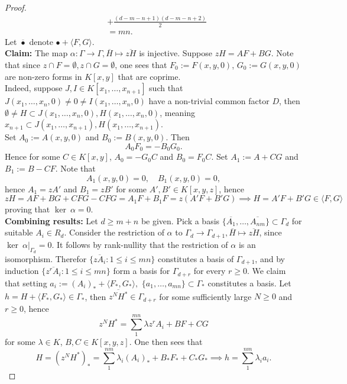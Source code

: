 \begin{proof}
\begin{align*}
            &+\frac{(d-m-n+1)(d-m-n+2)}{2}\\
            &= mn.
        \end{align*}
        Let $\overline{\bullet}$ denote $\bullet + \langle F,G\rangle$.\\
        \textbf{Claim:} The map $\alpha : \Gamma\rightarrow \Gamma, \overline{H} \mapsto \overline{zH}$ is injective. Suppose $zH=AF+BG$. Note that since $z\cap F = \emptyset,z\cap G = \emptyset$, one sees that $F_0:=F(x,y,0)$, $G_0:=G(x,y,0)$ are non-zero forms in $K[x,y]$ that are coprime.\\
        Indeed, suppose $J,I\in K[x_1,\dots,x_{n+1}]$ such that $J(x_1,\dots,x_n,0)\neq 0 \neq I(x_1,\dots,x_n,0)$ have a non-trivial common factor $D$, then $\emptyset\neq H\subset J(x_1,\dots,x_n,0),H(x_1,\dots,x_n,0)$, meaning $x_{n+1}\subset J(x_1,\dots,x_{n+1}),H(x_1,\dots,x_{n+1})$.\\
        Set $A_0:=A(x,y,0)$ and $B_0:= B(x,y,0)$. Then 
        $$A_0F_0 = -B_0G_0.$$
        Hence for some $C\in K[x,y]$, $A_0 = -G_0C$ and $B_0 = F_0C$. Set $A_1 := A+CG$ and $B_1 := B-CF$. Note that 
        $$A_1(x,y,0)=0, \quad B_1(x,y,0) = 0,$$
        hence $A_1= zA'$ and $B_1 = zB'$ for some $A',B'\in K[x,y,z]$, hence 
        $$zH= AF+BG+CFG-CFG = A_1F+B_1F = z(A'F+B'G)\implies H=A'F+B'G\in \langle F,G\rangle$$
        proving that $\ker\ \alpha = 0$.\\
        \textbf{Combining results:} Let $d\geq m+n$ be given. Pick a basis $\{\overline{A_1},\dots,\overline{A_{nm}}\}\subset \Gamma_d$ for suitable $A_i\in R_d$. Consider the restriction of $\alpha$ to $\Gamma_d \rightarrow \Gamma_{d+1}, \overline{H}\mapsto \overline{zH}$, since $\ker\ \left.\alpha\right|_{\Gamma_d} =0$. It follows by rank-nullity that the restriction of $\alpha$ is an isomorphism. Therefor $\{\overline{zA_i}:1\leq i\leq mn\}$ constitutes a basis of $\Gamma_{d+1}$, and by induction $\{\overline{z^rA_i}: 1\leq i\leq mn\}$ form a basis for $\Gamma_{d+r}$ for every $r\geq 0$. We claim that setting $a_i := (A_i)_\ast + \langle F_\ast,G_\ast\rangle,$ $\{a_1,\dots,a_{mn}\}\subset \Gamma_\ast$ constitutes a basis. Let $h = H + \langle F_\ast,G_\ast\rangle\in \Gamma_\ast$, then $\overline{z^NH^\ast}\in \Gamma_{d+r}$ for some sufficiently large $N\geq 0$ and $r\geq 0$, hence 
        $$z^NH^\ast = \sum_1^{mn} \lambda z^rA_i + BF+CG$$ for some $\lambda\in K$, $B,C\in K[x,y,z]$. One then sees that  
        $$H = (z^NH^\ast)_\ast = \sum_1^{nm} \lambda_i (A_i)_\ast+ B_\ast F_\ast+C_\ast G_\ast\implies h = \sum_1^{nm} \lambda_ia_i.$$

\end{proof}
